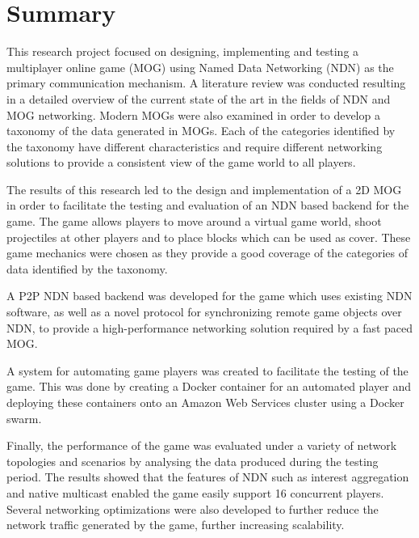 \chapter*{Summary}
This research project focused on designing, implementing and testing a multiplayer online game (MOG) using Named Data Networking (NDN) as the primary communication mechanism. A literature review was conducted resulting in a detailed overview of the current state of the art in the fields of NDN and MOG networking. Modern MOGs were also examined in order to develop a taxonomy of the data generated in MOGs. Each of the categories identified by the taxonomy have different characteristics and require different networking solutions to provide a consistent view of the game world to all players. 

The results of this research led to the design and implementation of a 2D MOG in order to facilitate the testing and evaluation of an NDN based backend for the game. The game allows players to move around a virtual game world, shoot projectiles at other players and to place blocks which can be used as cover. These game mechanics were chosen as they provide a good coverage of the categories of data identified by the taxonomy. 

A P2P NDN based backend was developed for the game which uses existing NDN software, as well as a novel protocol for synchronizing remote game objects over NDN, to provide a high-performance networking solution required by a fast paced MOG.

A system for automating game players was created to facilitate the testing of the game. This was done by creating a Docker container for an automated player and deploying these containers onto an Amazon Web Services cluster using a Docker swarm.  

Finally, the performance of the game was evaluated under a variety of network topologies and scenarios by analysing the data produced during the testing period. The results showed that the features of NDN such as interest aggregation and native multicast enabled the game easily support 16 concurrent players. Several networking optimizations were also developed to further reduce the network traffic generated by the game, further increasing scalability.
